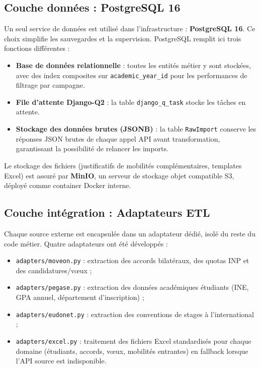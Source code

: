 \subsection{Couche données : PostgreSQL 16}

Un seul service de données est utilisé dans l'infrastructure : \textbf{PostgreSQL 16}. Ce choix simplifie les sauvegardes et la supervision. PostgreSQL remplit ici trois fonctions différentes :

\begin{itemize}
  \item \textbf{Base de données relationnelle} : toutes les entités métier y sont stockées, avec des index composites sur \texttt{academic\_year\_id} pour les performances de filtrage par campagne.
  \item \textbf{File d'attente Django-Q2} : la table \texttt{django\_q\_task} stocke les tâches en attente.
  \item \textbf{Stockage des données brutes (JSONB)} : la table \texttt{RawImport} conserve les réponses JSON brutes de chaque appel API avant transformation, garantissant la possibilité de relancer les imports.
\end{itemize}

Le stockage des fichiers (justificatifs de mobilités complémentaires, templates Excel) est assuré par \textbf{MinIO}, un serveur de stockage objet compatible S3, déployé comme container Docker interne.

\subsection{Couche intégration : Adaptateurs ETL}

Chaque source externe est encapsulée dans un adaptateur dédié, isolé du reste du code métier. Quatre adaptateurs ont été développés :

\begin{itemize}
  \item \texttt{adapters/moveon.py} : extraction des accords bilatéraux, des quotas INP et des candidatures/vœux ;
  \item \texttt{adapters/pegase.py} : extraction des données académiques étudiants (INE, GPA annuel, département d'inscription) ;
  \item \texttt{adapters/eudonet.py} : extraction des conventions de stages à l'international ;
  \item \texttt{adapters/excel.py} : traitement des fichiers Excel standardisés pour chaque domaine (étudiants, accords, vœux, mobilités entrantes) en fallback lorsque l'API source est indisponible.
\end{itemize}

